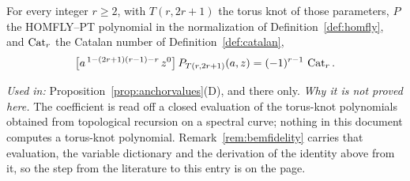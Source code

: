 \begin{axiom}
\label{ax:bem}
For every integer $r\geq2$, with $T(r,2r+1)$ the torus knot of those parameters,
$P$ the HOMFLY--PT polynomial in the normalization of
Definition~\ref{def:homfly}, and $\operatorname{Cat}_r$ the Catalan number of Definition~\ref{def:catalan},
\[
   \bigl[a^{\,1-(2r+1)(r-1)-r}\,z^{0}\bigr]\,P_{T(r,2r+1)}(a,z)
   =(-1)^{r-1}\,\operatorname{Cat}_r .
\]

\emph{Used in:} Proposition~\ref{prop:anchorvalues}(D), and there only.
\emph{Why it is not proved here.} The coefficient is read off a closed
evaluation of the torus-knot polynomials obtained from topological recursion on
a spectral curve; nothing in this document computes a torus-knot polynomial.
Remark~\ref{rem:bemfidelity} carries that evaluation, the variable dictionary
and the derivation of the identity above from it, so the step from the
literature to this entry is on the page.
\end{axiom}

